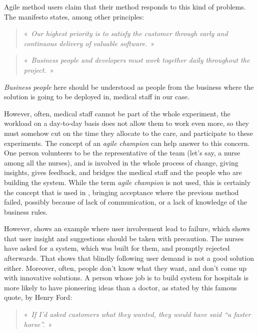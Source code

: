 \documentclass[a4paper,10pt]{article}
\begin{document}
\begin{multicols}{2}
Agile method users claim that their method responds to this kind of problems.
The manifesto \cite{AgileManifesto} states, among other principles:

\begin{quote}
«~\emph{Our highest priority is to satisfy the customer through early and
continuous delivery of valuable software.}~»
\end{quote}

\begin{quote}
«~\emph{Business people and developers must work together daily throughout the
project.}~»
\end{quote}

\emph{Business people} here should be understood as people from the business
where the solution is going to be deployed in, medical staff in our case.

However, often, medical staff cannot be part of the whole experiment, the
workload on a day-to-day basis does not allow them to work even more, so they
must somehow cut on the time they allocate to the care, and participate to these
experiments. The concept of an \emph{agile champion} can help answer to this
concern. One person volunteers to be the representative of the team (let's say, a
nurse among all the nurses), and is involved in the whole process of change,
giving insights, gives feedback, and bridges the medical staff and the people
who are building the system. While the term \emph{agile champion} is not used,
this is certainly the concept that is used in \cite{IndiaEMR}, bringing
acceptance where the previous method failed, possibly because of lack of
communication, or a lack of knowledge of the business rules.

However, \cite{Hasvold2011} shows an example where user involvement lead to
failure, which shows that user insight and suggestions should be taken with
precaution. The nurses have asked for a system, which was built for them, and
promptly rejected afterwards. That shows that blindly following user demand is
not a good solution either. Moreover, often, people don't know what they want,
and don't come up with innovative solutions. A person whose job is to build
system for hospitals is more likely to have pioneering ideas than a doctor, as
stated by this famous quote, by Henry Ford:

\begin{quote}
  «~\emph{If I'd asked customers what they wanted, they would have said ``a
  faster horse''.}~»
\end{quote}


\end{multicols}
\end{document}
